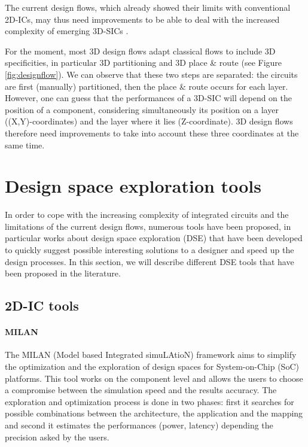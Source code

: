 The current design flows, which already showed their limits with conventional 2D-ICs, may thus need improvements to be able to deal with the increased complexity of emerging 3D-SICs \cite{vanderbiest06, PFF10}.

For the moment, most 3D design flows adapt classical flows to include 3D specificities, in particular 3D partitioning and 3D place \& route (see Figure \ref{fig:designflow}). We can observe that these two steps are separated: the circuits are first (manually) partitioned, then the place \& route occurs for each layer. However, one can guess that the performances of a 3D-SIC will depend on the position of a component, considering simultaneously its position on a layer ((X,Y)-coordinates) and the layer where it lies (Z-coordinate). 3D design flows therefore need improvements to take into account these three coordinates at the same time.

\section{Design space exploration tools}

In order to cope with the increasing complexity of integrated circuits and the limitations of the current design flows, numerous tools have been proposed, in particular works about design space exploration (DSE) that have been developed to quickly suggest possible interesting solutions to a designer and speed up the design processes. In this section, we will describe different DSE tools that have been proposed in the literature.

\subsection{2D-IC tools}

\paragraph{MILAN}

The MILAN (Model based Integrated simuLAtioN) framework \cite{Mohanty02rapidsystem-level} aims to simplify the optimization and the exploration of design spaces for System-on-Chip (SoC) platforms. This tool works on the component level and allows the users to choose a compromise between the simulation speed and the results accuracy. The exploration and optimization process is done in two phases: first it searches for possible combinations between the architecture, the application and the mapping and second it estimates the performances (power, latency) depending the precision asked by the users.

